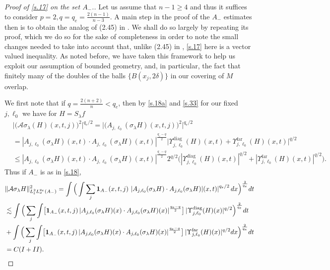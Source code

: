 \documentclass[10pt]{amsart}
\newcommand{\la}{\lambda}
\newcommand{\1}{{\bf 1}}
\newcommand{\A}{{\mathcal A}}
\newcommand{\diag}{\Upsilon^{\text{diag}}}
\newcommand{\far}{\Upsilon^{\text{far}}}
\begin{document}
\begin{proof}[Proof of \eqref{s.17} on the set $A_-$.]
Let us assume that $n-1\ge4$ and thus it suffices to consider $p=2, q=q_e=\frac{2(n-1)}{n-3}$.  A main step in the proof of the $A_-$ estimates then is to obtain the analog of (2.45) in \cite{HSst}.
We shall do so largely by repeating its proof, which we do so for the sake of completeness in order to note the small changes needed
to take into account that, unlike (2.45) in \cite{HSst}, \eqref{s.17} here is a vector valued inequality.  As noted before, we have taken
this framework to help us exploit our assumption of bounded geometry, and,  in particular, the fact that finitely many  of the 
 doubles of the balls $\{B(x_j,2\delta)\}$
in our covering of $M$  overlap.




We first note that if $q=\tfrac{2(n+2)}n<q_e$, then by \eqref{s.18a} and  \eqref{s.33} for our fixed $j, \ell_0$ we have for $H=S_\la f$
\begin{align*}
&\bigl|\bigl(\A\sigma_\la (H)(x,t,j)\bigr)^2\bigr|^{q_e/2}=\bigl|\bigl(A_{j,\ell_0}(\sigma_\la H)(x,t,j) \bigr)^2\bigr|^{q_e/2}
\\
&=|A_{j,\ell_0}(\sigma_\la H)(x,t) \cdot A_{j,\ell_0}(\sigma_\la H)(x,t)|^{\frac{q_e-q}2}
\bigl| \diag_{j,\ell_0}(H)(x,t) +\far_{j,\ell_0}(H)(x,t)\bigr|^{q/2}
\\
&\le |A_{j,\ell_0}(\sigma_\la H)(x,t) \cdot A_{j,\ell_0}(\sigma_\la H)(x,t)|^{\frac{q_e-q}2}
 2^{q/2}  \bigl( 
|\diag_{j,\ell_0}(H)(x,t)|^{q/2}
+|\far_{j,\ell_0}(H)(x,t)|^{q/2} \bigr).
\end{align*}
Thus if $A_-$ is as in \eqref{s.18},
\begin{equation}
    \begin{aligned}\label{s.38}
&\| \A \sigma_\la H
\|_{L^{2}_tL^{q_e}_x(A_-)}^2
=\int \Big(\int \sum_j \1_{A_-}(x,t,j) \, \left|A_{j,\ell_0}(\sigma_\la H)\cdot A_{j,\ell_0}(\sigma_\la H)|(x,t)\right|^{q_e/2}dx\Big)^{\frac2{q_e}}dt
\\
&\lesssim 
\int \Big(\sum_j \int 
\bigl[ \1_{A_-}(x,t,j) \, |A_{j,\ell_0}(\sigma_\la H)(x) \cdot A_{j,\ell_0}(\sigma_\la H)(x)|^{\frac{q_e-q}2}
\bigr] \, |\diag_{j,\ell_0}(H)(x)|^{q/2}\Big)^{\frac2{q_e}}dt
\\
&+\int \Big(\sum_j \int 
\bigl[ \1_{A_-}(x,t,j) \, |A_{j,\ell_0}(\sigma_\la H)(x) \cdot A_{j,\ell_0}(\sigma_\la H)(x)|^{\frac{q_e-q}2}
\bigr] \, |\far_{j,\ell_0}(H)(x)|^{q/2}dx\Big)^{\frac2{q_e}}dt \\ &=C(I+II).\notag
\end{aligned}
\end{equation}





\end{proof}
\end{document}
